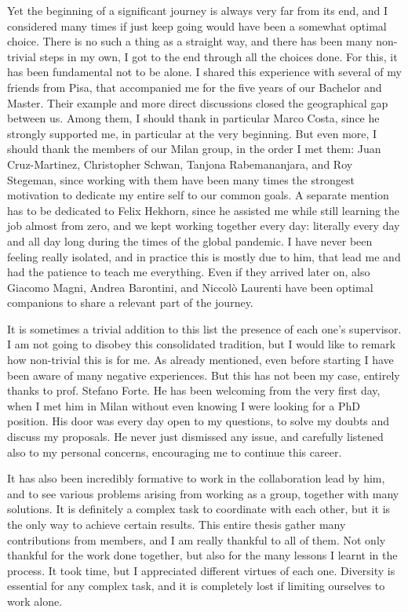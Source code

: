 Yet the beginning of a significant journey is always very far from its end, and
I considered many times if just keep going would have been a somewhat optimal
choice. There is no such a thing as a straight way, and there has been many
non-trivial steps in my own, I got to the end through all the choices done.
%
For this, it has been fundamental not to be alone. I shared this experience
with several of my friends from Pisa, that accompanied me for the five years of
our Bachelor and Master. Their example and more direct discussions closed the
geographical gap between us.
Among them, I should thank in particular Marco Costa, since he strongly
supported me, in particular at the very beginning.
%
But even more, I should thank the members of our Milan group, in the order I
met them: Juan Cruz-Martinez, Christopher Schwan, Tanjona Rabemananjara, and
Roy Stegeman, since working with them have been many times the strongest
motivation to dedicate my entire self to our common goals.
A separate mention has to be dedicated to Felix Hekhorn, since he assisted me
while still learning the job almost from zero, and we kept working together
every day: literally every day and all day long during the times of the global
pandemic. I have never been feeling really isolated, and in practice this is
mostly due to him, that lead me and had the patience to teach me everything.
Even if they arrived later on, also Giacomo Magni, Andrea Barontini, and
Niccol\`o Laurenti have been optimal companions to share a relevant part of the
journey.

It is sometimes a trivial addition to this list the presence of each one's
supervisor. I am not going to disobey this consolidated tradition, but I would
like to remark how non-trivial this is for me.
As already mentioned, even before starting I have been aware of many negative
experiences. But this has not been my case, entirely thanks to prof. Stefano
Forte.
%
He has been welcoming from the very first day, when I met him in Milan without
even knowing I were looking for a PhD position.
His door was every day open to my questions, to solve my doubts and discuss my
proposals. He never just dismissed any issue, and carefully listened also to my
personal concerns, encouraging me to continue this career.

It has also been incredibly formative to work in the \nnpdf collaboration lead
by him, and to see various problems arising from working as a group, together
with many solutions.
It is definitely a complex task to coordinate with each other, but it is the
only way to achieve certain results.
This entire thesis gather many contributions from \nnpdf members, and I am
really thankful to all of them. Not only thankful for the work done together,
but also for the many lessons I learnt in the process.
It took time, but I appreciated different virtues of each one. Diversity is
essential for any complex task, and it is completely lost if limiting ourselves
to work alone.

